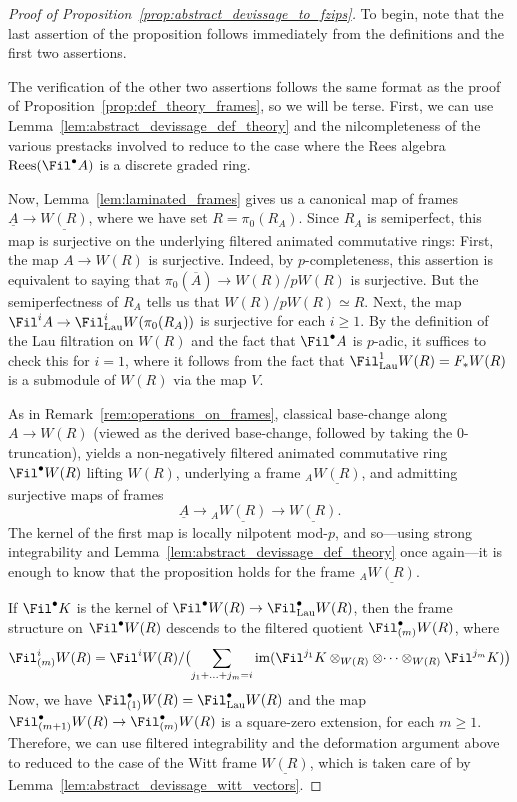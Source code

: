 \documentclass[10pt]{amsart}
\begin{document}
\begin{proof}
[Proof of Proposition~\ref{prop:abstract_devissage_to_fzips}]
To begin, note that the last assertion of the proposition follows immediately from the definitions and the first two assertions. 

The verification of the other two assertions follows the same format as the proof of Proposition~\ref{prop:def_theory_frames}, so we will be terse. First, we can use Lemma~\ref{lem:abstract_devissage_def_theory} and the nilcompleteness of the various prestacks involved to reduce to the case where the Rees algebra $\mathrm{Rees}(\Fil^\bullet A)$ is a discrete graded ring.

Now, Lemma~\ref{lem:laminated_frames} gives us a canonical map of frames $\underline{A}\to \underline{W(R)}$, where we have set $R = \pi_0(R_A)$. Since $R_A$ is semiperfect, this map is surjective on the underlying filtered animated commutative rings: First, the map $A\to W(R)$ is surjective. Indeed, by $p$-completeness, this assertion is equivalent to saying that $\pi_0(\overline{A})\to W(R)/pW(R)$ is surjective. But the semiperfectness of $R_A$ tells us that $W(R)/pW(R)\simeq R$. Next, the map $\Fil^i A \to \Fil^i_{\mathrm{Lau}}W(\pi_0(R_A))$ is surjective for each $i\ge 1$. By the definition of the Lau filtration on $W(R)$ and the fact that $\Fil^\bullet A$ is $p$-adic, it suffices to check this for $i=1$, where it follows from the fact that $\Fil^1_{\mathrm{Lau}}W(R) = F_*W(R)$ is a submodule of $W(R)$ via the map $V$.

As in Remark~\ref{rem:operations_on_frames}, classical base-change along $A\to W(R)$ (viewed as the derived base-change, followed by taking the $0$-truncation), yields a non-negatively filtered animated commutative ring $\Fil^\bullet W(R)$ lifting $W(R)$, underlying a frame ${}_A\underline{W(R)}$, and admitting surjective maps of frames
\[
\underline{A}\to {}_A\underline{W(R)}\to \underline{W(R)}.
\]
The kernel of the first map is locally nilpotent mod-$p$, and so---using strong integrability and Lemma~\ref{lem:abstract_devissage_def_theory} once again---it is enough to know that the proposition holds for the frame ${}_A\underline{W(R)}$. 

If $\Fil^\bullet K$ is the kernel of $\Fil^\bullet W(R)\to \Fil^\bullet_{\mathrm{Lau}}W(R)$, then the frame structure on $\Fil^\bullet W(R)$ descends to the filtered quotient $\Fil^\bullet_{(m)}W(R)$, where
\[
\Fil^i_{(m)}W(R) = \Fil^iW(R)/\bigl(\sum_{j_1+\ldots+j_m = i}\mathrm{im}(\Fil^{j_1}K\otimes_{W(R)}\otimes{\cdots}\otimes_{W(R)}\Fil^{j_m}K)\bigr)
\]
Now, we have $\Fil^\bullet_{(1)}W(R) = \Fil^\bullet_{\mathrm{Lau}}W(R)$ and the map $\Fil^\bullet_{(m+1)}W(R)\to\Fil^\bullet_{(m)}W(R)$ is a square-zero extension, for each $m\ge 1$. Therefore, we can use filtered integrability and the deformation argument above to reduced to the case of the Witt frame $\underline{W(R)}$, which is taken care of by Lemma~\ref{lem:abstract_devissage_witt_vectors}.
\end{proof}
\end{document}
